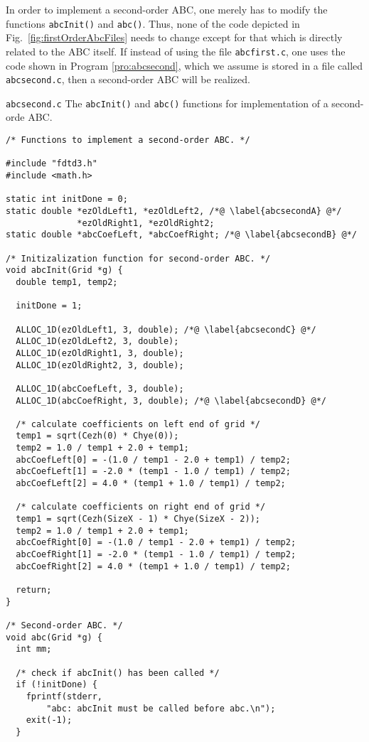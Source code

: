 In order to implement a second-order ABC, one merely has to modify the
functions {\tt abcInit()} and {\tt abc()}.  Thus, none of the code
depicted in Fig.\ \ref{fig:firstOrderAbcFiles} needs to change except
for that which is directly related to the ABC itself.  If instead of
using the file {\tt abcfirst.c}, one uses the code shown in Program
\ref{pro:abcsecond}, which we assume is stored in a file called {\tt
abcsecond.c}, then a second-order ABC will be realized.

\begin{program}
{\tt abcsecond.c} The {\tt abcInit()} and {\tt abc()} functions for
implementation of a second-orde ABC.
\label{pro:abcsecond}
\codemiddle
\begin{lstlisting}
/* Functions to implement a second-order ABC. */

#include "fdtd3.h"
#include <math.h>

static int initDone = 0;
static double *ezOldLeft1, *ezOldLeft2, /*@ \label{abcsecondA} @*/
              *ezOldRight1, *ezOldRight2;
static double *abcCoefLeft, *abcCoefRight; /*@ \label{abcsecondB} @*/

/* Initizalization function for second-order ABC. */
void abcInit(Grid *g) {
  double temp1, temp2;
  
  initDone = 1;

  ALLOC_1D(ezOldLeft1, 3, double); /*@ \label{abcsecondC} @*/
  ALLOC_1D(ezOldLeft2, 3, double);
  ALLOC_1D(ezOldRight1, 3, double);
  ALLOC_1D(ezOldRight2, 3, double);

  ALLOC_1D(abcCoefLeft, 3, double);
  ALLOC_1D(abcCoefRight, 3, double); /*@ \label{abcsecondD} @*/

  /* calculate coefficients on left end of grid */
  temp1 = sqrt(Cezh(0) * Chye(0));
  temp2 = 1.0 / temp1 + 2.0 + temp1;
  abcCoefLeft[0] = -(1.0 / temp1 - 2.0 + temp1) / temp2;
  abcCoefLeft[1] = -2.0 * (temp1 - 1.0 / temp1) / temp2;
  abcCoefLeft[2] = 4.0 * (temp1 + 1.0 / temp1) / temp2;

  /* calculate coefficients on right end of grid */
  temp1 = sqrt(Cezh(SizeX - 1) * Chye(SizeX - 2));
  temp2 = 1.0 / temp1 + 2.0 + temp1;
  abcCoefRight[0] = -(1.0 / temp1 - 2.0 + temp1) / temp2;
  abcCoefRight[1] = -2.0 * (temp1 - 1.0 / temp1) / temp2;
  abcCoefRight[2] = 4.0 * (temp1 + 1.0 / temp1) / temp2;

  return;
}

/* Second-order ABC. */
void abc(Grid *g) {
  int mm;

  /* check if abcInit() has been called */
  if (!initDone) {
    fprintf(stderr,
	    "abc: abcInit must be called before abc.\n");
    exit(-1);
  }


\end{lstlisting}
\end{program}
